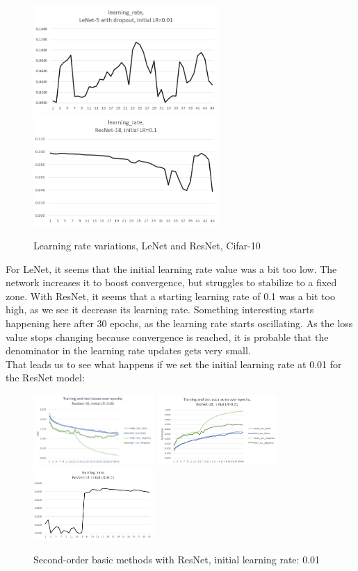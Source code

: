 \documentclass{article}
\begin{document}
  \begin{figure}[!h]
	\includegraphics[width=200pt]{lr_lenet_d_0_01.png}
	\includegraphics[width=200pt]{lr_resnet_0_1.png}
	\caption{Learning rate variations, LeNet and ResNet, Cifar-10}
\end{figure}
  
  For LeNet, it seems that the initial learning rate value was a bit too low. The network increases it to boost convergence, but struggles to stabilize to a fixed zone. With ResNet, it seems that a starting learning rate of 0.1 was a bit too high, as we see it decrease its learning rate. Something interesting starts happening here after 30 epochs, as the learning rate starts oscillating. As the loss value stops changing because convergence is reached, it is probable that the denominator in the learning rate updates gets very small.\\
  
  That leads us to see what happens if we set the initial learning rate at 0.01 for the ResNet model:\\
  
  \begin{figure}[!h]
	\includegraphics[width=130pt]{loss_resnet_0_01.png}
	\includegraphics[width=130pt]{acc_resnet_0_01.png}
	\includegraphics[width=130pt]{lr_resnet_0_01.png}
	\caption{Second-order basic methods with ResNet, initial learning rate: 0.01}
  \end{figure}
  
\end{document}
